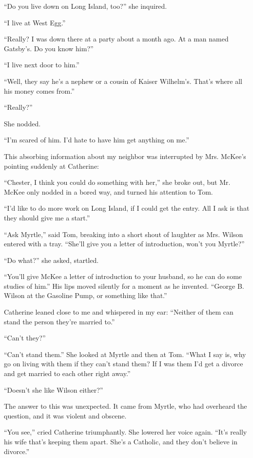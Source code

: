 \documentclass{znotebook}
\begin{document}
``Do you live down on Long Island, too?'' she inquired.

``I live at West Egg.''

``Really? I was down there at a party about a month ago. At a man named Gatsby's. Do you know him?''

``I live next door to him.''

``Well, they say he's a nephew or a cousin of Kaiser Wilhelm's. That's where all his money comes from.''

``Really?''

She nodded.

``I'm scared of him. I'd hate to have him get anything on me.''

This absorbing information about my neighbor was interrupted by Mrs. McKee's pointing suddenly at Catherine:

``Chester, I think you could do something with her,'' she broke out, but Mr. McKee only nodded in a bored way, and turned his attention to Tom.

``I'd like to do more work on Long Island, if I could get the entry. All I ask is that they should give me a start.''

``Ask Myrtle,'' said Tom, breaking into a short shout of laughter as Mrs. Wilson entered with a tray. ``She'll give you a letter of introduction, won't you Myrtle?''

``Do what?'' she asked, startled.

``You'll give McKee a letter of introduction to your husband, so he can do some studies of him.'' His lips moved silently for a moment as he invented. ``George B. Wilson at the Gasoline Pump, or something like that.''

Catherine leaned close to me and whispered in my ear: ``Neither of them can stand the person they're married to.''

``Can't they?''

``Can't stand them.'' She looked at Myrtle and then at Tom. ``What I say is, why go on living with them if they can't stand them? If I was them I'd get a divorce and get married to each other right away.''

``Doesn't she like Wilson either?''

The answer to this was unexpected. It came from Myrtle, who had overheard the question, and it was violent and obscene.

``You see,'' cried Catherine triumphantly. She lowered her voice again. ``It's really his wife that's keeping them apart. She's a Catholic, and they don't believe in divorce.''
\end{document}
